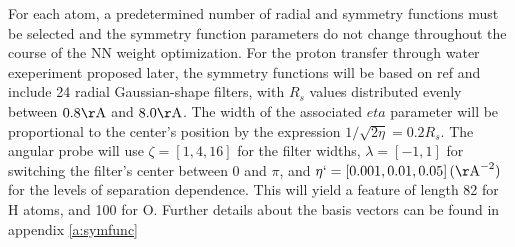 \documentclass{article}
\begin{document}
For each atom, a predetermined number of radial and symmetry functions must be selected and the symmetry function parameters do not change throughout the course of the NN weight optimization.
 For the proton transfer through water exeperiment proposed later, the symmetry functions will be based on ref and include 24 radial Gaussian-shape filters, with $R_s$ values distributed evenly between $0.8 \mathrm{\AA}$ and $8.0 \mathrm{\AA}$.
 The width of the associated $eta$ parameter will be proportional to the center's position by the expression $1/\sqrt{2\eta} = 0.2 R_s$. The angular probe will use $\zeta = \left[ 1, 4, 16 \right]$ for the filter widths, $\lambda = \left[ -1, 1 \right]$ for switching the filter's center between 0 and $\pi$, and $\eta` = \left[ 0.001, 0.01, 0.05\right] (\mathrm{\AA}^{-2})$ for the levels of separation dependence. This will yield a feature of length 82 for H atoms, and 100 for O. Further details about the basis vectors can be found in appendix \ref{a:symfunc}
\end{document}
